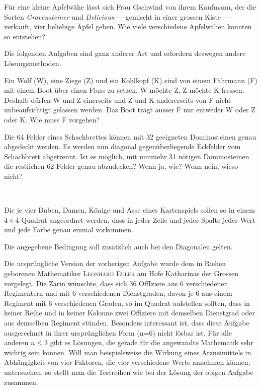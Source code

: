 \documentclass[%
11pt,%
twoside,%
titlepage,%
german,%
headsepline%
]{scrartcl}
\begin{document}
\begin{ueb}[Öpfuchueche]\label{aepfel}
 Für eine kleine Apfelwähe lässt sich Frau Gschwind von ihrem Kaufmann, der die Sorten \emph{Gravensteiner} und \emph{Delicious} --- gemischt in einer grossen Kiste --- verkauft, vier beliebige Äpfel geben. Wie viele verschiedene Apfelwähen könnten so entstehen?
 \end{ueb}
 
 Die folgenden Aufgaben sind ganz anderer Art und erfordern deswegen andere Lö\-sungs\-me\-tho\-den.
 
 \begin{ueb}[Fährmannproblem]
  Ein Wolf (W), eine Ziege (Z) und ein Kohlkopf (K) sind von einem Fährmann (F) mit einem Boot über einen Fluss zu setzen. W möchte Z, Z möchte K fressen. Deshalb dürfen W und Z einerseits und Z und K andererseits von F nicht unbeaufsichtigt gelassen werden. Das Boot trägt ausser F nur entweder W oder Z oder K. Wie muss F vorgehen?
  \end{ueb}
  
  \begin{ueb}
Die 64 Felder eines Schachbrettes können mit 32 geeigneten Dominosteinen genau abgedeckt werden. Es werden nun diagonal gegenüberliegende Eckfelder vom Schachbrett abgetrennt. Ist es möglich, mit nunmehr 31 nötigen Dominosteinen die restlichen 62 Felder genau abzudecken? Wenn ja, wie? Wenn nein, wieso nicht?
  \end{ueb}
  
  \begin{ueb}
  \ \\[-4ex]
  \begin{enumeratea}
  \item Die je vier Buben, Damen, Könige und Asse eines Kartenspiels sollen so in einem $4\times4$ Quadrat angeordnet werden, dass in jeder Zeile und jeder Spalte jeder Wert und jede Farbe genau einmal vorkommen.
\item Die angegebene Bedingung soll zusätzlich auch bei den Diagonalen gelten.
  \end{enumeratea}
  \end{ueb}
  
  Die ursprüngliche Version der vorherigen Aufgabe wurde dem in Riehen geborenen Mathematiker \textsc{Leonhard Euler} am Hofe Katharinas der Grossen vorgelegt. Die Zarin wünschte, dass sich 36 OffIziere aus 6 verschiedenen Regimentern und mit 6 verschiedenen Dienstgraden, davon je 6 aus einem Regiment mit 6 verschiedenen Graden, so im Quadrat aufstellen sollten, dass in keiner Reihe und in keiner Kolonne zwei Offiziere mit demselben Dienstgrad oder aus demselben Regiment stünden. Besonders interessant ist, dass diese Aufgabe ausgerechnet in ihrer ursprünglichen Form (n=6) nicht lösbar ist. Für alle anderen $n\leq3$ gibt es Lösungen, die gerade für die angewandte Mathematik sehr wichtig sein können. Will man beispielsweise die Wirkung eines Arzneimittels in Abhängigkeit von vier Faktoren, die vier verschiedene Werte annehmen können, untersuchen, so stellt man die Testreihen wie bei der Lösung der obigen Aufgabe zusammen.
  
\end{document}

